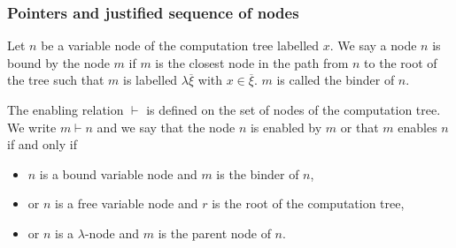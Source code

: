 \subsubsection{Pointers and justified sequence of nodes}

\begin{dfn}[Binder]
Let $n$ be a variable node of the computation tree labelled $x$. We
say a node $n$ is bound by the node $m$ if $m$ is the closest node
in the path from $n$ to the root of the tree such that $m$ is
labelled $\lambda \overline{\xi}$ with $x\in \overline{\xi}$. $m$ is
called the binder of $n$.
\end{dfn}

\begin{dfn}[Enabling]
The enabling relation $\vdash$ is defined on the set of nodes of the
computation tree. We write $m \vdash n$ and we say that the node $n$
is enabled by $m$ or that $m$ enables $n$ if and only if
\begin{itemize}
\item $n$ is a bound variable node and $m$ is the binder of $n$,
\item or $n$ is a free variable node and $r$ is the root of the computation tree,
\item or $n$ is a $\lambda$-node and $m$ is the parent node of $n$.
\end{itemize}
\end{dfn}



